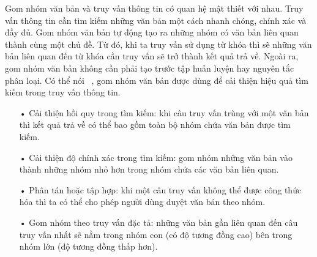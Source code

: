 Gom nhóm văn bản và truy vấn thông tin có quan hệ mật thiết với nhau.
Truy vấn thông tin cần tìm kiếm những văn bản một cách nhanh chóng, chính xác và đầy đủ.
Gom nhóm văn bản tự động tạo ra những nhóm có văn bản liên quan thành cùng một chủ đề.
Từ đó, khi ta truy vấn sử dụng từ khóa thì sẽ những văn bản liên quan đến từ khóa cần truy vấn sẽ trở thành kết quả trả về.
Ngoài ra, gom nhóm văn bản không cần phải tạo trước tập huấn luyện hay nguyên tắc phân loại.
Có thể nói ~\cite{text-clustering}, gom nhóm văn bản được dùng để cải thiện hiệu quả tìm kiếm trong truy vấn thông tin.
\begin{enumerate}
\item[•]Cải thiện hồi quy trong tìm kiếm: khi câu truy vấn trùng với một văn bản thì kết quả trả về có thể bao gồm toàn bộ nhóm chứa văn bản được tìm kiếm.
\item[•]Cải thiện độ chính xác trong tìm kiếm: gom nhóm những văn bản vào thành những nhóm nhỏ hơn trong nhóm chứa các văn bản liên quan.
\item[•]Phân tán hoặc tập hợp: khi một câu truy vấn không thể được công thức hóa thì ta có thể cho phép người dùng duyệt văn bản theo nhóm.
\item[•]Gom nhóm theo truy vấn đặc tả: những văn bản gần liên quan đến câu truy vấn nhất sẽ nằm trong nhóm con (có độ tương đồng cao) bên trong nhóm lớn (độ tương đồng thấp hơn).
\end{enumerate}


